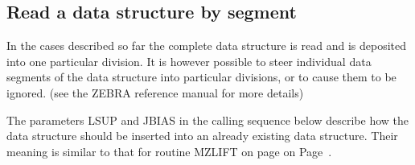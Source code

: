 \subsection{Read a data structure by segment}
\par In the cases described so far the complete data structure is
read and is deposited into one particular division.
It is however possible to steer individual data segments of
the data structure into particular divisions,
or to cause them to be ignored.
(see the ZEBRA reference manual for more details)
\par The parameters LSUP and JBIAS in the calling sequence below
describe how the data structure should be inserted into
an already existing data structure. Their meaning
is similar to that for routine MZLIFT on page
on Page~\pageref{MZLIFT FORM=PAGEONLY}.
